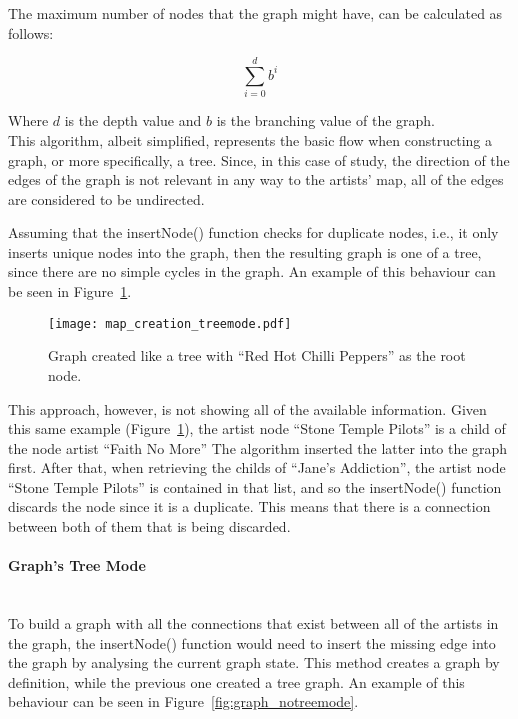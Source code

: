       The maximum number of nodes that the graph might have, can be calculated as follows:

      \begin{equation}
          \sum_{i=0}^{d} b ^ i
      \end{equation}

      Where $d$ is the depth value and $b$ is the branching value of the graph. \\

      This algorithm, albeit simplified, represents the basic flow when constructing a graph, or more specifically, a tree.
      Since, in this case of study, the direction of the edges of the graph is not relevant in any way to the artists' map, all of the edges are considered to be undirected.

      Assuming that the insertNode() function checks for duplicate nodes, i.e., it only inserts unique nodes into the graph, then the resulting graph is one of a tree, since there are no simple cycles in the graph.
      An example of this behaviour can be seen in Figure~\ref{fig:graph_treemode}.

      \begin{figure}[ht]
        \begin{center}
          \texttt{[image: map\_creation\_treemode.pdf]}
        \end{center}
        \caption{Graph created like a tree with ``Red Hot Chilli Peppers'' as the root node.}
        \label{fig:graph_treemode}
      \end{figure}

      This approach, however, is not showing all of the available information.
      Given this same example (Figure~\ref{fig:graph_treemode}), the artist node ``Stone Temple Pilots'' is a child of the node artist ``Faith No More''
      The algorithm inserted the latter into the graph first.
      After that, when retrieving the childs of ``Jane's Addiction'', the artist node ``Stone Temple Pilots'' is contained in that list, and so the insertNode() function discards the node since it is a duplicate.
      This means that there is a connection between both of them that is being discarded.

      \paragraph{Graph's Tree Mode} \hfill \\
      To build a graph with all the connections that exist between all of the artists in the graph, the insertNode() function would need to insert the missing edge into the graph by analysing the current graph state.
      This method creates a graph by definition, while the previous one created a tree graph.
      An example of this behaviour can be seen in Figure~\ref{fig:graph_notreemode}.

